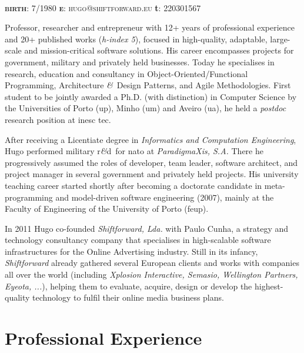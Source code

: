 \documentclass[9pt, a4paper]{article}
\newcommand{\amper}{{\fontspec[Scale=.95]{Hoefler Text}\selectfont\itshape\&}}
\newcommand{\marginimage}{
}
\newcommand{\acr}[1]{{\sc #1}}
\newcommand{\rnd}{{\sc r\amper d}~}
\begin{document}

{\huge\sc{}}\\
{\small {\scshape  {\bfseries birth}: 7/1980 \hspace{7.5mm} {\bfseries e}: hugo@shiftforward.eu} \hspace{7mm} {\bfseries t}: 220301567}\\

\marginimage{\small Professor, researcher and entrepreneur with 12+ years of professional experience and 20+ published works (\emph{h-index 5}), focused in high-quality, adaptable, large-scale and mission-critical software solutions. His career encompasses projects for government, military and privately held businesses. Today he specialises in research, education and consultancy in Object-Oriented/Functional Programming, Architecture \amper~Design Patterns, and Agile Methodologies. First student to be jointly awarded a Ph.D. (with distinction) in Computer Science by the Universities of Porto {\sc (up)}, Minho {\sc (um)} and Aveiro {\sc (ua)}, he held a \emph{postdoc} research position at \acr{inesc tec}.

\vspace{1mm}After receiving a Licentiate degree in \emph{Informatics and Computation Engineering}, Hugo performed military \rnd for \acr{nato} at \emph{ParadigmaXis, S.A.} There he progressively assumed the roles of developer, team leader, software architect, and project manager in several government and privately held projects. His university teaching career started shortly after becoming a doctorate candidate in meta-programming and model-driven software engineering (2007), mainly at the Faculty of Engineering of the University of Porto (\acr{feup}).

\vspace{1mm}In 2011 Hugo co-founded \emph{Shiftforward, Lda.} with Paulo Cunha, a strategy and technology consultancy company that specialises in high-scalable software infrastructures for the Online Advertising industry. Still in its infancy, \emph{Shiftforward} already gathered several European clients and works with companies all over the world (including \emph{Xplosion Interactive, Semasio, Wellington Partners, Eyeota, ...}), helping them to evaluate, acquire, design or develop the highest-quality technology to fulfil their online media business plans.}

\section*{Professional Experience}
\end{document}
